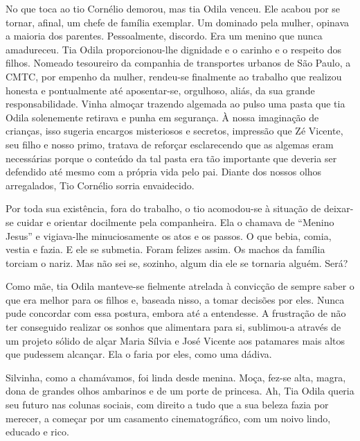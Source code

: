No que toca ao tio Cornélio demorou, mas tia Odila venceu.
Ele acabou por se tornar, afinal, um chefe de família exemplar.
Um dominado pela mulher, opinava a maioria dos parentes.
Pessoalmente, discordo.
Era um menino que nunca amadureceu.
Tia Odila proporcionou-lhe dignidade e o carinho e o respeito dos filhos.
Nomeado tesoureiro da companhia de transportes urbanos de São Paulo, a CMTC, por empenho da mulher, rendeu-se finalmente ao trabalho que realizou honesta e pontualmente até aposentar-se, orgulhoso, aliás, da sua grande responsabilidade.
Vinha almoçar trazendo algemada ao pulso uma pasta que tia Odila solenemente retirava e punha em segurança.
À nossa imaginação de crianças, isso sugeria encargos misteriosos e secretos, impressão que Zé Vicente, seu filho e nosso primo, tratava de reforçar esclarecendo que as algemas eram necessárias porque o conteúdo da tal pasta era tão importante que deveria ser defendido até mesmo com a própria vida pelo pai.
Diante dos nossos olhos arregalados, Tio Cornélio sorria envaidecido.


Por toda sua existência, fora do trabalho, o tio acomodou-se à situação de deixar-se cuidar e orientar docilmente pela companheira.
Ela o chamava de ``Menino Jesus'' e vigiava-lhe minuciosamente os atos e os passos.
O que bebia, comia, vestia e fazia.
E ele se submetia.
Foram felizes assim.
Os machos da família torciam o nariz.
Mas não sei se, sozinho, algum dia ele se tornaria alguém.
Será?

Como mãe, tia Odila manteve-se fielmente atrelada à convicção de sempre saber o que era melhor para os filhos e, baseada nisso, a tomar decisões por eles.
Nunca pude concordar com essa postura, embora até a entendesse.
A frustração de não ter conseguido realizar os sonhos que alimentara para si, sublimou-a através de um projeto sólido de alçar Maria Sílvia e José Vicente aos patamares mais altos que pudessem alcançar.
Ela o faria por eles, como uma dádiva.

Silvinha, como a chamávamos, foi linda desde menina.
Moça, fez-se alta, magra, dona de grandes olhos ambarinos e de um porte de princesa.
Ah, Tia Odila queria seu futuro nas colunas sociais, com direito a tudo que a sua beleza fazia por merecer, a começar por um casamento cinematográfico, com um noivo lindo, educado e rico.


